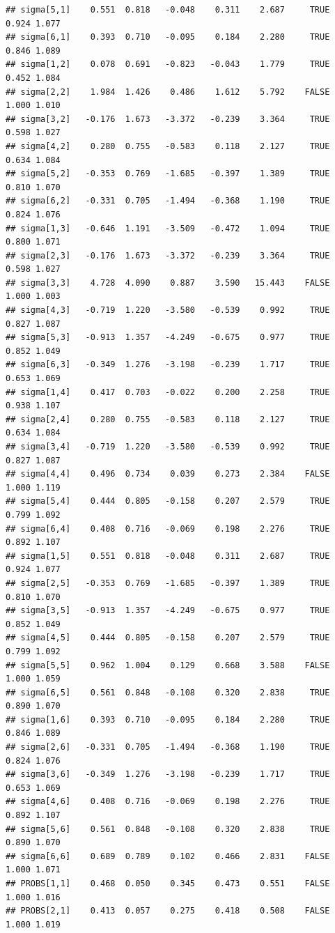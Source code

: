 \documentclass[]{article}
\begin{document}
\begin{verbatim}
## sigma[5,1]    0.551  0.818   -0.048    0.311    2.687     TRUE 0.924 1.077
## sigma[6,1]    0.393  0.710   -0.095    0.184    2.280     TRUE 0.846 1.089
## sigma[1,2]    0.078  0.691   -0.823   -0.043    1.779     TRUE 0.452 1.084
## sigma[2,2]    1.984  1.426    0.486    1.612    5.792    FALSE 1.000 1.010
## sigma[3,2]   -0.176  1.673   -3.372   -0.239    3.364     TRUE 0.598 1.027
## sigma[4,2]    0.280  0.755   -0.583    0.118    2.127     TRUE 0.634 1.084
## sigma[5,2]   -0.353  0.769   -1.685   -0.397    1.389     TRUE 0.810 1.070
## sigma[6,2]   -0.331  0.705   -1.494   -0.368    1.190     TRUE 0.824 1.076
## sigma[1,3]   -0.646  1.191   -3.509   -0.472    1.094     TRUE 0.800 1.071
## sigma[2,3]   -0.176  1.673   -3.372   -0.239    3.364     TRUE 0.598 1.027
## sigma[3,3]    4.728  4.090    0.887    3.590   15.443    FALSE 1.000 1.003
## sigma[4,3]   -0.719  1.220   -3.580   -0.539    0.992     TRUE 0.827 1.087
## sigma[5,3]   -0.913  1.357   -4.249   -0.675    0.977     TRUE 0.852 1.049
## sigma[6,3]   -0.349  1.276   -3.198   -0.239    1.717     TRUE 0.653 1.069
## sigma[1,4]    0.417  0.703   -0.022    0.200    2.258     TRUE 0.938 1.107
## sigma[2,4]    0.280  0.755   -0.583    0.118    2.127     TRUE 0.634 1.084
## sigma[3,4]   -0.719  1.220   -3.580   -0.539    0.992     TRUE 0.827 1.087
## sigma[4,4]    0.496  0.734    0.039    0.273    2.384    FALSE 1.000 1.119
## sigma[5,4]    0.444  0.805   -0.158    0.207    2.579     TRUE 0.799 1.092
## sigma[6,4]    0.408  0.716   -0.069    0.198    2.276     TRUE 0.892 1.107
## sigma[1,5]    0.551  0.818   -0.048    0.311    2.687     TRUE 0.924 1.077
## sigma[2,5]   -0.353  0.769   -1.685   -0.397    1.389     TRUE 0.810 1.070
## sigma[3,5]   -0.913  1.357   -4.249   -0.675    0.977     TRUE 0.852 1.049
## sigma[4,5]    0.444  0.805   -0.158    0.207    2.579     TRUE 0.799 1.092
## sigma[5,5]    0.962  1.004    0.129    0.668    3.588    FALSE 1.000 1.059
## sigma[6,5]    0.561  0.848   -0.108    0.320    2.838     TRUE 0.890 1.070
## sigma[1,6]    0.393  0.710   -0.095    0.184    2.280     TRUE 0.846 1.089
## sigma[2,6]   -0.331  0.705   -1.494   -0.368    1.190     TRUE 0.824 1.076
## sigma[3,6]   -0.349  1.276   -3.198   -0.239    1.717     TRUE 0.653 1.069
## sigma[4,6]    0.408  0.716   -0.069    0.198    2.276     TRUE 0.892 1.107
## sigma[5,6]    0.561  0.848   -0.108    0.320    2.838     TRUE 0.890 1.070
## sigma[6,6]    0.689  0.789    0.102    0.466    2.831    FALSE 1.000 1.071
## PROBS[1,1]    0.468  0.050    0.345    0.473    0.551    FALSE 1.000 1.016
## PROBS[2,1]    0.413  0.057    0.275    0.418    0.508    FALSE 1.000 1.019

\end{verbatim}
\end{document}
